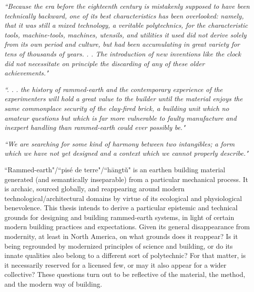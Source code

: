 \begin{flushright}
\small{
\textit{
``Because the era before the eighteenth century is mistakenly supposed to have been technically backward, one of its best characteristics has been overlooked: namely, that it was still a mixed technology, a veritable polytechnics, for the characteristic tools, machine-tools, machines, utensils, and utilities it used did not derive solely from its own period and culture, but had been accumulating in great variety for tens of thousands of years. . . The introduction of new inventions like the clock did not necessitate on principle the discarding of any of these older achievements." \cite[p.134]{MYTHMACHINE}}}
\end{flushright}

\begin{flushright}
  \small{
  \textit{``. . . the history of rammed-earth and the contemporary
experience of the experimenters will hold a great value to
the builder until the material enjoys the same commonplace
security of the clay-fired brick, a building unit which no
amateur questions but which is far more vulnerable to
faulty manufacture and inexpert handling than rammed-earth
could ever possibly be." \cite[p.xvi]{RAMMEDEARTHHOUSE}}}
\end{flushright}

\begin{flushright}
  \small{
  \textit{``We are searching for some kind of harmony between two intangibles; a form which we have not yet designed and a context which we cannot properly describe." \cite[p.6]{SYNOFFORM}}}
\end{flushright}

``Rammed-earth"/``pis\'e de terre"/``h\=angt\v u" is an earthen building material generated (and semantically inseparable) from a particular mechanical process. It is archaic, sourced globally, and reappearing around modern technological/architectural domains by virtue of its ecological and physiological benevolence. This thesis intends to derive a particular epistemic and technical grounds for designing and building rammed-earth systems, in light of certain modern building practices and expectations.  Given its general disappearance from modernity, at least in North America, on what grounds does it reappear? Is it being regrounded by modernized principles of science and building, or do its innate qualities also belong to a different sort of polytechnic? For that matter, is it necessarily reserved for a licensed few, or may it also appear for a wider collective? These questions turn out to be reflective of the material, the method, and the modern way of building.

